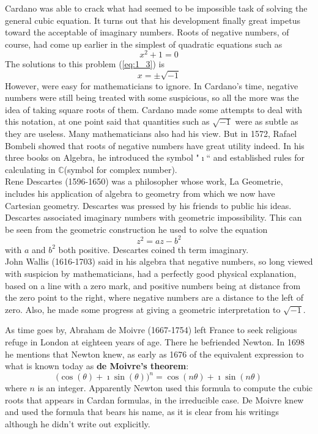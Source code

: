 \documentclass[12pt]{report}
\newcommand{\refn}[1]{(\ref{#1})}
\newcommand{\refx}[1]{\refn{eq:#1}}
\newcommand{\bt}[1]{\textbf{#1}}
\newcommand{\NI}{\noindent}
\newcommand{\imaginary}{\imath}
\newcommand{\complex}{\mathbb{C}}
\begin{document}
	\NI Cardano was able to crack what had seemed to be impossible task of solving the general cubic equation. It turns out that his development finally great impetus toward the acceptable of imaginary numbers. Roots of negative numbers, of course, had come up earlier in the simplest of quadratic equations such as 
	\begin{equation}
		x^2 + 1 = 0\label{eq:1_3}
	\end{equation}
	The solutions to this problem \refx{1_3} is
	\begin{equation}
		x= \pm\sqrt{-1}\label{eq:1_4}
	\end{equation}
	However, were easy for mathematicians to ignore. In Cardano's time, negative numbers were still being treated with some suspicious, so all the more was the idea of taking square roots of them. Cardano made some attempts to deal with this notation, at one point said that quantities such as $\sqrt{-1}$ were as subtle as they are useless. Many mathematicians also had his view. But in 1572, Rafael Bombeli showed that roots of negative numbers have great utility indeed. In his three books on Algebra, he introduced the symbol "$\imaginary$`` and established rules for calculating in $\complex$(symbol for complex number).\\
	
	\NI Rene Descartes (1596-1650) was a philosopher whose work, La Geometrie, includes his application of algebra to geometry from which we now have Cartesian geometry. Descartes was pressed by his friends to public his ideas. Descartes associated imaginary numbers with geometric impossibility. This can be seen from the geometric construction he used to solve the equation
	\begin{equation}
		z^2 = az-b^2\label{eq:1_5}
	\end{equation}
	with $a$ and $b^2$ both positive. Descartes coined th term imaginary.\\
	
	\NI John Wallis (1616-1703) said in his algebra that negative numbers, so long viewed with suspicion by mathematicians, had a perfectly good physical explanation, based on a line with a zero mark, and positive numbers being at distance from the zero point to the right, where negative numbers are a distance to the left of zero. Also, he made some progress at giving a geometric interpretation to $\sqrt{-1}$.
	
	\NI As time goes by, Abraham de Moivre (1667-1754) left France to seek religious refuge in London at eighteen years of age. There he befriended Newton. In 1698 he mentions that Newton knew, as early as 1676 of the equivalent expression to what is known today as \bt{de Moivre's theorem}:
	\begin{equation}
		\Big(\cos(\theta) + \imaginary\sin(\theta)\Big)^n = \cos(n\theta) + \imaginary\sin(n\theta)\label{eq:1_6}
	\end{equation}
	where $n$ is an integer. Apparently Newton used this formula to compute the cubic roots that appears in Cardan formulas, in the irreducible case. De Moivre knew and used the formula that bears his name, as it is clear from his writings although he didn't write out explicitly.\\
	
\end{document}
